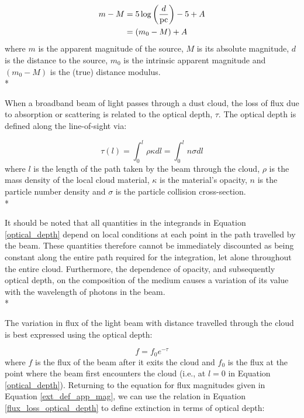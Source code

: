 \documentclass[12pt, a4paper]{report}
\begin{document}
\begin{align}
\begin{split}
m - M &= 5\log\left(\frac{d}{\textnormal{pc}}\right) - 5 + A \\
      &= (m_{0} - M) + A
\end{split}
\label{ext_def_app_mag}
\end{align}
where $m$ is the apparent magnitude of the source, $M$ is its absolute magnitude, $d$ is the distance to the source, $m_{0}$ is the intrinsic apparent magnitude and $(m_{0} - M)$ is the (true) distance modulus. \\*


When a broadband beam of light passes through a dust cloud, the loss of flux due to absorption or scattering is related to the optical depth, $\tau$. The optical depth is defined along the line-of-sight via:

\begin{equation}
\tau(l) = \int_{0}^{l} \rho \kappa dl = \int_{0}^{l} n \sigma dl
\label{optical_depth}
\end{equation}
where $l$ is the length of the path taken by the beam through the cloud, $\rho$ is the mass density of the local cloud material, $\kappa$ is the material's opacity, $n$ is the particle number density and $\sigma$ is the particle collision cross-section.\\*

It should be noted that all quantities in the integrands in Equation \ref{optical_depth} depend on local conditions at each point in the path travelled by the beam. These quantities therefore cannot be immediately discounted as being constant along the entire path required for the integration, let alone throughout the entire cloud. Furthermore, the dependence of opacity, and subsequently optical depth, on the composition of the medium causes a variation of its value with the wavelength of photons in the beam.\\*

The variation in flux of the light beam with distance travelled through the cloud is best expressed using the optical depth:

\begin{equation}
f = f_{0} e^{-\tau}
\label{flux_loss_optical_depth}
\end{equation}
where $f$ is the flux of the beam after it exits the cloud and $f_{0}$ is the flux at the point where the beam first encounters the cloud (i.e., at $l = 0$ in Equation \ref{optical_depth}). Returning to the equation for flux magnitudes given in Equation \ref{ext_def_app_mag}, we can use the relation in Equation \ref{flux_loss_optical_depth} to define extinction in terms of optical depth:
\end{document}
